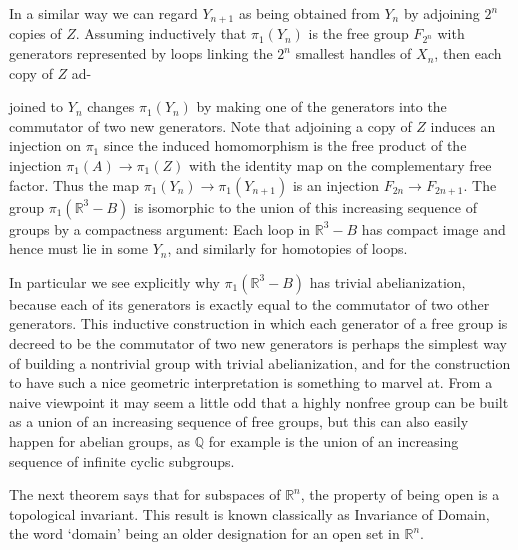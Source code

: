 In a similar way we can regard $Y_{n+1}$ as being obtained from $Y_n$ by adjoining $2^n$ copies of $Z$. Assuming inductively that $\pi_1(Y_n)$ is the free group $F_{2^n}$ with generators represented by loops linking the $2^n$ smallest handles of $X_n$, then each copy of $Z$ ad-

joined to $Y_n$ changes $\pi_1(Y_n)$ by making one of the generators into the commutator of
two new generators. Note that adjoining a copy of $Z$ induces an injection on $\pi_1$ since
the induced homomorphism is the free product of the injection $\pi_1(A) \to \pi_1(Z)$ with
the identity map on the complementary free factor. Thus the map $\pi_1(Y_n) \to \pi_1(Y_{n+1})$
is an injection $F_{2n} \to F_{2n+1}$. The group $\pi_1(\mathbb{R}^3 - B)$ is isomorphic to the union of this
increasing sequence of groups by a compactness argument: Each loop in $\mathbb{R}^3 - B$ has
compact image and hence must lie in some $Y_n$, and similarly for homotopies of loops.

In particular we see explicitly why $\pi_1(\mathbb{R}^3 - B)$ has trivial abelianization, because
each of its generators is exactly equal to the commutator of two other generators.
This inductive construction in which each generator of a free group is decreed to
be the commutator of two new generators is perhaps the simplest way of building a
nontrivial group with trivial abelianization, and for the construction to have such a
nice geometric interpretation is something to marvel at. From a naive viewpoint it may
seem a little odd that a highly nonfree group can be built as a union of an increasing
sequence of free groups, but this can also easily happen for abelian groups, as $\mathbb{Q}$ for
example is the union of an increasing sequence of infinite cyclic subgroups.

The next theorem says that for subspaces of $\mathbb{R}^n$, the property of being open is
a topological invariant. This result is known classically as Invariance of Domain, the
word `domain' being an older designation for an open set in $\mathbb{R}^n$.

